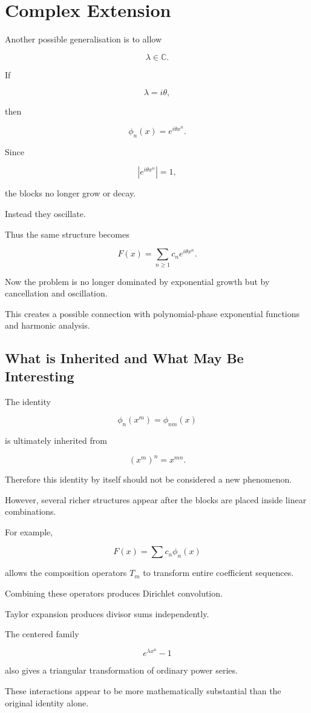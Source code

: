 
\chapter{Complex Extension}


Another possible generalisation is to allow

\[
\lambda\in\mathbb{C}.
\]

If

\[
\lambda=i\theta,
\]

then

\[
\phi_n(x)
=
e^{i\theta x^n}.
\]

Since

\[
|e^{i\theta x^n}|=1,
\]

the blocks no longer grow or decay.

Instead they oscillate.

Thus the same structure becomes

\[
\boxed{
F(x)
=
\sum_{n\geq1}
c_ne^{i\theta x^n}.
}
\]

Now the problem is no longer dominated by exponential growth but by
cancellation and oscillation.

This creates a possible connection with polynomial-phase exponential
functions and harmonic analysis.

\section{What is Inherited and What May Be Interesting}

The identity

\[
\phi_n(x^m)=\phi_{nm}(x)
\]

is ultimately inherited from

\[
(x^m)^n=x^{mn}.
\]

Therefore this identity by itself should not be considered a new
phenomenon.

However, several richer structures appear after the blocks are placed
inside linear combinations.

For example,

\[
F(x)
=
\sum c_n\phi_n(x)
\]

allows the composition operators \(T_m\) to transform entire
coefficient sequences.

Combining these operators produces Dirichlet convolution.

Taylor expansion produces divisor sums independently.

The centered family

\[
e^{\lambda x^n}-1
\]

also gives a triangular transformation of ordinary power series.

These interactions appear to be more mathematically substantial than
the original identity alone.

